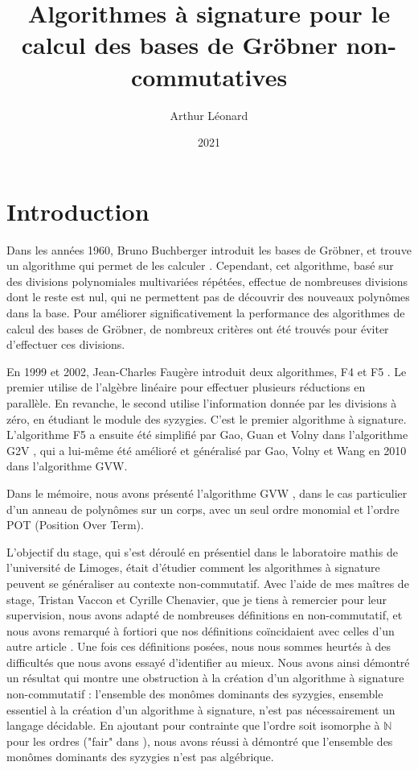 \documentclass{article}
\title{Algorithmes à signature pour le calcul des bases de Gröbner non-commutatives}
\author{Arthur Léonard}
\date{2021}
\newcommand{\N}{\mathbb{N}}
\begin{document}
\maketitle

\section*{Introduction}
Dans les années 1960, Bruno Buchberger introduit les bases de Gröbner, et trouve un algorithme qui permet de les calculer \cite{buchberger}. Cependant, cet algorithme, basé sur des divisions polynomiales multivariées répétées, effectue de nombreuses divisions dont le reste est nul, qui ne permettent pas de découvrir des nouveaux polynômes dans la base. Pour améliorer significativement la performance des algorithmes de calcul des bases de Gröbner, de nombreux critères ont été trouvés pour éviter d'effectuer ces divisions.

En 1999 et 2002, Jean-Charles Faugère introduit deux algorithmes, F4 \cite{f4} et F5 \cite{f5}. Le premier utilise de l'algèbre linéaire pour effectuer plusieurs réductions en parallèle. En revanche, le second utilise l'information donnée par les divisions à zéro, en étudiant le module des syzygies. C'est le premier algorithme à signature. L'algorithme F5 a ensuite été simplifié par Gao, Guan et Volny dans l'algorithme G2V \cite{g2v}, qui a lui-même été amélioré et généralisé par Gao, Volny et Wang en 2010 dans l'algorithme GVW.

Dans le mémoire, nous avons présenté l'algorithme GVW \cite{gvw}, dans le cas particulier d'un anneau de polynômes sur un corps, avec un seul ordre monomial et l'ordre POT (Position Over Term).

L'objectif du stage, qui s'est déroulé en présentiel dans le laboratoire mathis de l'université de Limoges, était d'étudier comment les algorithmes à signature peuvent se généraliser au contexte non-commutatif. Avec l'aide de mes maîtres de stage, Tristan Vaccon et Cyrille Chenavier, que je tiens à remercier pour leur supervision, nous avons adapté de nombreuses définitions en non-commutatif, et nous avons remarqué à fortiori que nos définitions coïncidaient avec celles d'un autre article \cite{noncom}. Une fois ces définitions posées, nous nous sommes heurtés à des difficultés que nous avons essayé d'identifier au mieux. Nous avons ainsi démontré un résultat qui montre une obstruction à la création d'un algorithme à signature non-commutatif : l'ensemble des monômes dominants des syzygies, ensemble essentiel à la création d'un algorithme à signature, n'est pas nécessairement un langage décidable. En ajoutant pour contrainte que l'ordre soit isomorphe à $\N$ pour les ordres ("fair" dans \cite{noncom}), nous avons réussi à démontré que l'ensemble des monômes dominants des syzygies n'est pas algébrique.
\end{document}
